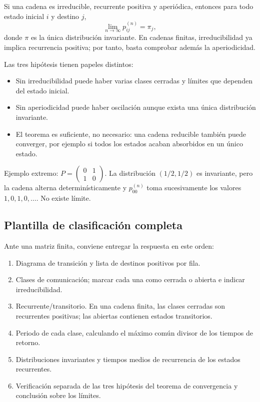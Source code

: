 \documentclass[11pt,oneside]{article}
\newcommand{\1}{\mathbf{1}}
\begin{document}
Si una cadena es irreducible, recurrente positiva y aperiódica, entonces para todo estado inicial $i$ y destino $j$,
\[
\lim_{n\to\infty}p_{ij}^{(n)}=\pi_j,
\]
donde $\pi$ es la única distribución invariante. En cadenas finitas, irreducibilidad ya implica recurrencia positiva; por tanto, basta comprobar además la aperiodicidad.

Las tres hipótesis tienen papeles distintos:
\begin{itemize}
  \item Sin irreducibilidad puede haber varias clases cerradas y límites que dependen del estado inicial.
  \item Sin aperiodicidad puede haber oscilación aunque exista una única distribución invariante.
  \item El teorema es suficiente, no necesario: una cadena reducible también puede converger, por ejemplo si todos los estados acaban absorbidos en un único estado.
\end{itemize}

Ejemplo extremo: $P=\begin{pmatrix}0&1\\1&0\end{pmatrix}$. La distribución $(1/2,1/2)$ es invariante, pero la cadena alterna determinísticamente y $p_{00}^{(n)}$ toma sucesivamente los valores $1,0,1,0,\ldots$. No existe límite.

\subsection{Plantilla de clasificación completa}

Ante una matriz finita, conviene entregar la respuesta en este orden:
\begin{enumerate}
  \item Diagrama de transición y lista de destinos positivos por fila.
  \item Clases de comunicación; marcar cada una como cerrada o abierta e indicar irreducibilidad.
  \item Recurrente/transitorio. En una cadena finita, las clases cerradas son recurrentes positivas; las abiertas contienen estados transitorios.
  \item Periodo de cada clase, calculando el máximo común divisor de los tiempos de retorno.
  \item Distribuciones invariantes y tiempos medios de recurrencia de los estados recurrentes.
  \item Verificación separada de las tres hipótesis del teorema de convergencia y conclusión sobre los límites.
\end{enumerate}
\end{document}
